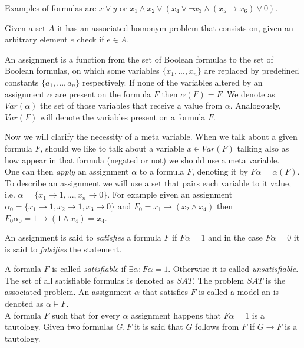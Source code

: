 Examples of formulas are $x\vee y$ or $x_1\wedge x_2 \vee  ( x_4 \vee \neg  x_3 \wedge (x_5\rightarrow x_6) \vee 0 )$. \\


\begin{definition} Given a set $A$ it has an associated homonym problem that consists on, given an arbitrary element $e$ check if $e\in A$.	
\end{definition}


\begin{definition}
	An assignment is a function from the set of Boolean formulas to the set of Boolean formulas, on which some variables $\{x_1,...,x_n \}$ are replaced by predefined constants $\{a_1,...,a_n\}$ respectively. If none of the variables altered by an assignment $\alpha$ are present on the formula $F$ then $\alpha(F) = F$. We denote as $Var(\alpha)$ the set of those variables that receive a value from $\alpha$. Analogously, $Var(F)$ will denote the variables present on a formula $F$.
      \end{definition}

      Now we will clarify the necessity of a meta variable. When we talk about a given formula $F$, should we like to talk about a variable $x \in Var(F)$ talking also as how appear in that formula (negated or not) we should use a meta variable. \\

	
	One can then \emph{apply} an assignment $\alpha$ to a formula $F$, denoting it by $F\alpha=\alpha(F)$. To describe an assignment we will use a set that pairs each variable to it value, i.e. $\alpha=\{x_1\to 1,...,x_n\to 0\}$. For example given an assignment $\alpha_0 = \{x_1 \to 1, x_2\to 1, x_3 \to 0\}$ and $F_0=x_1\to (x_2\wedge x_4)$ then  $F_0\alpha_0=1 \to (1\wedge x_4)= x_4$. \\
	
	\begin{definition}
	An assignment is said to \emph{satisfies}  a formula $F$ if $F\alpha=1$ and in the case $F  \alpha = 0 $ it is said to \emph{falsifies} the statement.
\end{definition}
	
	\begin{definition}
	A formula $F$ is called \emph{satisfiable} if $\exists \alpha : F\alpha = 1.$ Otherwise it is called \emph{unsatisfiable}. The set of all satisfiable formulas is denoted as $SAT$.  The problem $SAT$ is the associated problem. 	An assignment $\alpha$ that satisfies $F$ is called a model an is denoted as $\alpha \models F$.\\
	
	
	A formula $F$ such that for every  $\alpha$ assignment happens that $F\alpha=1$ is a tautology. Given two formulas $G,F$ it is said that $G$ follows from $F$ if $G\rightarrow F$ is a tautology. \\
\end{definition}
	
